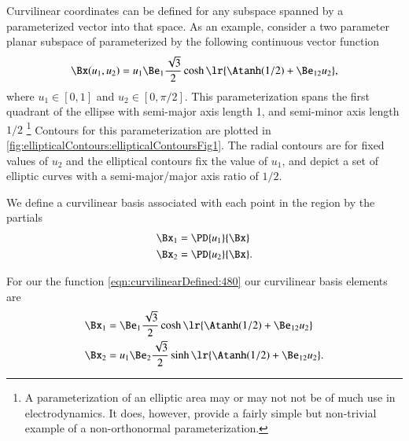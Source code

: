 %
%
Curvilinear coordinates can be defined for any subspace spanned by a parameterized vector into that space.
As an example, consider a two parameter planar subspace of parameterized by the following continuous vector function
\begin{dmath}\label{eqn:curvilinearDefined:480}
\Bx(u_1, u_2) = u_1 \Be_1 \frac{\sqrt{3}}{2} \cosh\lr{ \Atanh(1/2) + \Be_{12} u_2 },
\end{dmath}
where \( u_1 \in [0,1] \) and \( u_2 \in [0, \pi/2] \).
This parameterization spans the first quadrant of the ellipse with semi-major axis length 1, and semi-minor axis length \( 1/2 \)
\footnote{
A parameterization of an elliptic area may or may not not be of much use in electrodynamics.  It does, however, provide a fairly simple but non-trivial example of a non-orthonormal parameterization.}
Contours for this parameterization are plotted in \cref{fig:ellipticalContours:ellipticalContoursFig1}.
The radial contours are for fixed values of \( u_2 \) and the elliptical contours fix the value of \( u_1 \), and depict a set of elliptic curves
with a semi-major/major axis ratio of \( 1/2 \).


We define a curvilinear basis associated with each point in the region by the partials
\begin{dmath}\label{eqn:curvilinearDefined:80}
\begin{aligned}
\Bx_{1} &= \PD{u_1}{\Bx} \\
\Bx_{2} &= \PD{u_2}{\Bx}.
\end{aligned}
\end{dmath}

For our the function \cref{eqn:curvilinearDefined:480} our curvilinear basis elements are
\begin{dmath}\label{eqn:curvilinearDefined:520}
\begin{aligned}
\Bx_{1} &= \Be_1 \frac{\sqrt{3}}{2} \cosh\lr{ \Atanh(1/2) + \Be_{12} u_2 } \\
\Bx_{2} &= u_1 \Be_2 \frac{\sqrt{3}}{2} \sinh\lr{ \Atanh(1/2) + \Be_{12} u_2 }.
\end{aligned}
\end{dmath}

